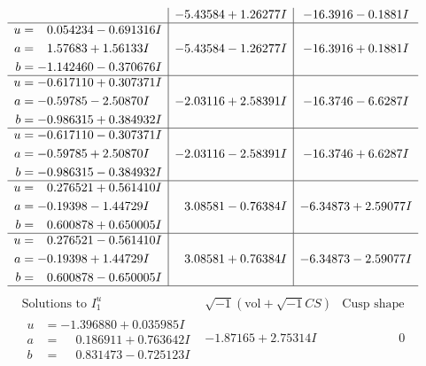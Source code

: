 \documentclass[1p]{elsarticle_modified}
\theoremstyle{definition}
\newcommand{\I}{\sqrt{-1}}
\begin{document}
$$\begin{array}{c|c|c}
 & -5.43584 + 1.26277 I & -16.3916 - 0.1881 I \\ \hline\begin{aligned}
u &= \phantom{-}0.054234 - 0.691316 I \\
a &= \phantom{-}1.57683 + 1.56133 I \\
b &= -1.142460 - 0.370676 I\end{aligned}
 & -5.43584 - 1.26277 I & -16.3916 + 0.1881 I \\ \hline\begin{aligned}
u &= -0.617110 + 0.307371 I \\
a &= -0.59785 - 2.50870 I \\
b &= -0.986315 + 0.384932 I\end{aligned}
 & -2.03116 + 2.58391 I & -16.3746 - 6.6287 I \\ \hline\begin{aligned}
u &= -0.617110 - 0.307371 I \\
a &= -0.59785 + 2.50870 I \\
b &= -0.986315 - 0.384932 I\end{aligned}
 & -2.03116 - 2.58391 I & -16.3746 + 6.6287 I \\ \hline\begin{aligned}
u &= \phantom{-}0.276521 + 0.561410 I \\
a &= -0.19398 - 1.44729 I \\
b &= \phantom{-}0.600878 + 0.650005 I\end{aligned}
 & \phantom{-}3.08581 - 0.76384 I & -6.34873 + 2.59077 I \\ \hline\begin{aligned}
u &= \phantom{-}0.276521 - 0.561410 I \\
a &= -0.19398 + 1.44729 I \\
b &= \phantom{-}0.600878 - 0.650005 I\end{aligned}
 & \phantom{-}3.08581 + 0.76384 I & -6.34873 - 2.59077 I\\
 \hline 
 \end{array}$$\newpage$$\begin{array}{c|c|c}  
\text{Solutions to }I^u_{1}& \I (\text{vol} + \sqrt{-1}CS) & \text{Cusp shape}\\
 \hline 
\begin{aligned}
u &= -1.396880 + 0.035985 I \\
a &= \phantom{-}0.186911 + 0.763642 I \\
b &= \phantom{-}0.831473 - 0.725123 I\end{aligned}
 & -1.87165 + 2.75314 I & \phantom{-0.000000 } 0 \\ \hline\begin{aligned}

\end{aligned}
\end{array}$$
\end{document}
